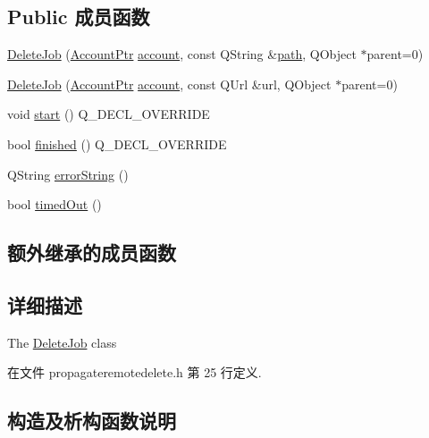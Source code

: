 \subsection*{Public 成员函数}
\begin{DoxyCompactItemize}
\item 
\hyperlink{class_o_c_c_1_1_delete_job_a62cb36e7bafbe31ee3012fd31b7246a0}{Delete\+Job} (\hyperlink{namespace_o_c_c_a848616aedb9188e223c6b9867757fe69}{Account\+Ptr} \hyperlink{class_o_c_c_1_1_abstract_network_job_a469c9d8212a338ad07d1efa1a94f784d}{account}, const Q\+String \&\hyperlink{class_o_c_c_1_1_abstract_network_job_a8ed2423a454ec861c20f6900f5591ef7}{path}, Q\+Object $\ast$parent=0)
\item 
\hyperlink{class_o_c_c_1_1_delete_job_a5bec443c978be66efb5a70230ff27daa}{Delete\+Job} (\hyperlink{namespace_o_c_c_a848616aedb9188e223c6b9867757fe69}{Account\+Ptr} \hyperlink{class_o_c_c_1_1_abstract_network_job_a469c9d8212a338ad07d1efa1a94f784d}{account}, const Q\+Url \&url, Q\+Object $\ast$parent=0)
\item 
void \hyperlink{class_o_c_c_1_1_delete_job_a48875d9957b8186fdf8ae59b77cd4195}{start} () Q\+\_\+\+D\+E\+C\+L\+\_\+\+O\+V\+E\+R\+R\+I\+DE
\item 
bool \hyperlink{class_o_c_c_1_1_delete_job_a5776804580c1eee33e5bf72a614a49f1}{finished} () Q\+\_\+\+D\+E\+C\+L\+\_\+\+O\+V\+E\+R\+R\+I\+DE
\item 
Q\+String \hyperlink{class_o_c_c_1_1_delete_job_a063e3b6e58a4cef98d25c04b532c4c33}{error\+String} ()
\item 
bool \hyperlink{class_o_c_c_1_1_delete_job_a78d5ea040853243a5df75d483e8689b8}{timed\+Out} ()
\end{DoxyCompactItemize}
\subsection*{额外继承的成员函数}


\subsection{详细描述}
The \hyperlink{class_o_c_c_1_1_delete_job}{Delete\+Job} class 

在文件 propagateremotedelete.\+h 第 25 行定义.



\subsection{构造及析构函数说明}
\mbox{\label{class_o_c_c_1_1_delete_job_a62cb36e7bafbe31ee3012fd31b7246a0}} 
